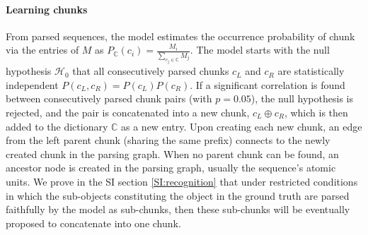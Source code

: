 \documentclass{article} %
\theoremstyle{remark}
\newcommand{\peter}[1]{\textcolor{purple}{Peter: #1}}
\begin{document}
\paragraph{Learning chunks} 
From parsed sequences, the model estimates the occurrence probability of chunk via the entries of $M$ as $P_{\mathbb{C}}(c_i) = \frac{M_{i}}{\sum_{c_j \in \mathbb{C}}M_{j}}$.
The model starts with the null hypothesis $\mathcal{H}_0$ that all consecutively parsed chunks $c_L$ and $c_R$ are statistically independent $P(c_L,c_R) = P(c_L)P(c_R)$.  If a significant correlation is found between consecutively parsed chunk pairs (with $p = 0.05$), the null hypothesis is rejected, and the pair is concatenated into a new chunk, $c_L \oplus c_R$, which is then added to the dictionary $\mathbb{C}$ as a new entry. Upon creating each new chunk, an edge from the left parent chunk (sharing the same prefix) connects to the newly created chunk in the parsing graph. When no parent chunk can be found, an ancestor node is created in the parsing graph, usually the sequence's atomic units. We prove in the SI section \ref{SI:recognition} that under restricted conditions in which the sub-objects constituting the object in the ground truth are parsed faithfully by the model as sub-chunks, then these sub-chunks will be eventually proposed to concatenate into one chunk. 


\end{document}

